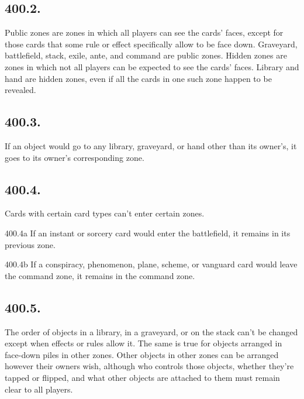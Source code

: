 \subsection*{400.2.}
Public zones are zones in which all players can see the cards’ faces, except for those cards that some rule or effect specifically allow to be face down. Graveyard, battlefield, stack, exile, ante, and command are public zones. Hidden zones are zones in which not all players can be expected to see the cards’ faces. Library and hand are hidden zones, even if all the cards in one such zone happen to be revealed.

\subsection*{400.3.}
If an object would go to any library, graveyard, or hand other than its owner’s, it goes to its owner’s corresponding zone.

\subsection*{400.4.}
Cards with certain card types can’t enter certain zones.

400.4a If an instant or sorcery card would enter the battlefield, it remains in its previous zone.

400.4b If a conspiracy, phenomenon, plane, scheme, or vanguard card would leave the command zone, it remains in the command zone.

\subsection*{400.5.}
The order of objects in a library, in a graveyard, or on the stack can’t be changed except when effects or rules allow it. The same is true for objects arranged in face-down piles in other zones. Other objects in other zones can be arranged however their owners wish, although who controls those objects, whether they’re tapped or flipped, and what other objects are attached to them must remain clear to all players.

